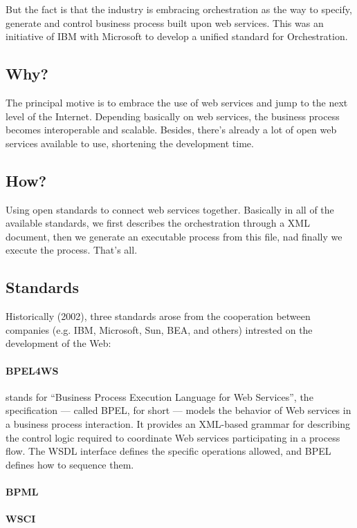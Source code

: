 \documentclass[12pt,a4paper]{article}
\begin{document}
But the fact is that the industry is embracing orchestration as the way to specify, generate and control business process built upon web services. This was an initiative of IBM with Microsoft to develop a unified standard for Orchestration.

\subsection{Why?}

The principal motive is to embrace the use of web services and jump to the next level of the Internet. Depending basically on web services, the business process becomes interoperable and scalable. Besides, there's already a lot of open web services available to use, shortening the development time.

\subsection{How?}
Using open standards to connect web services together.
Basically in all of the available standards, we first describes the orchestration through a XML document, then we generate an executable process from this file, nad finally we execute the process.
That's all.

\subsection{Standards}
Historically (2002), three standards arose from the cooperation between companies (e.g. IBM, Microsoft, Sun, BEA, and others) intrested on the development of the Web:

\paragraph{BPEL4WS} 
stands for ``Business Process Execution Language for Web Services'', the specification — called BPEL, for short — models the behavior of Web services in a business process interaction. It provides an XML-based grammar for describing the control logic required to coordinate Web services participating in a process flow. The WSDL interface defines the specific operations allowed, and BPEL defines how to sequence them.

\paragraph{BPML} 

\paragraph{WSCI}
\end{document}
